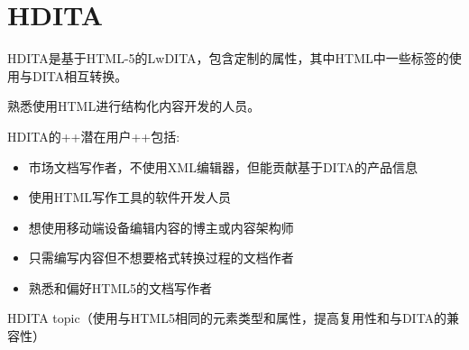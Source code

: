 \documentclass[letterpaper,10pt,english]{sphinxmanual}
\begin{document}
\section{HDITA}
\label{\detokenize{chap4:hdita}}
HDITA是基于HTML-5的LwDITA，包含定制的属性，其中HTML中一些标签的使用与DITA相互转换。

熟悉使用HTML进行结构化内容开发的人员。

HDITA的++潜在用户++包括:
\begin{itemize}
\item {} 
市场文档写作者，不使用XML编辑器，但能贡献基于DITA的产品信息

\item {} 
使用HTML写作工具的软件开发人员

\item {} 
想使用移动端设备编辑内容的博主或内容架构师

\item {} 
只需编写内容但不想要格式转换过程的文档作者

\item {} 
熟悉和偏好HTML5的文档写作者


\end{itemize}

HDITA topic（使用与HTML5相同的元素类型和属性，提高复用性和与DITA的兼容性）
\end{document}
